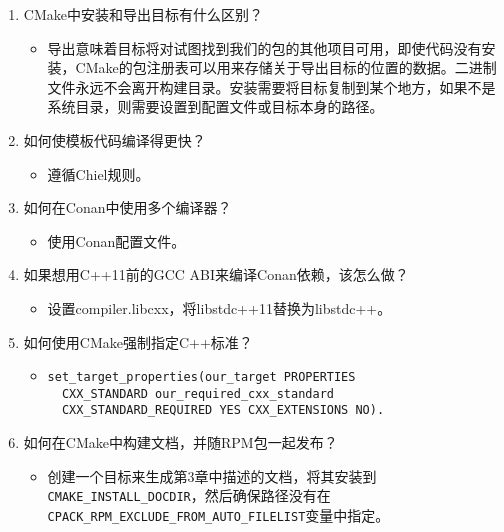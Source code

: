 \begin{enumerate}
\item
CMake中安装和导出目标有什么区别？
\begin{itemize}
\item 
导出意味着目标将对试图找到我们的包的其他项目可用，即使代码没有安装，CMake的包注册表可以用来存储关于导出目标的位置的数据。二进制文件永远不会离开构建目录。安装需要将目标复制到某个地方，如果不是系统目录，则需要设置到配置文件或目标本身的路径。
\end{itemize}

\item
如何使模板代码编译得更快？
\begin{itemize}
\item 
遵循Chiel规则。
\end{itemize}

\item
如何在Conan中使用多个编译器？
\begin{itemize}
\item 
使用Conan配置文件。
\end{itemize}

\item
如果想用C++11前的GCC ABI来编译Conan依赖，该怎么做？
\begin{itemize}
\item 
设置compiler.libcxx，将libstdc++11替换为libstdc++。
\end{itemize}

\item
如何使用CMake强制指定C++标准？
\begin{itemize}
\item 
\begin{lstlisting}[style=styleCMake]
set_target_properties(our_target PROPERTIES
  CXX_STANDARD our_required_cxx_standard
  CXX_STANDARD_REQUIRED YES CXX_EXTENSIONS NO).
\end{lstlisting}
\end{itemize}

\item
如何在CMake中构建文档，并随RPM包一起发布？
\begin{itemize}
\item 
创建一个目标来生成第3章中描述的文档，将其安装到\texttt{CMAKE\_INSTALL\_DOCDIR}，然后确保路径没有在\texttt{CPACK\_RPM\_EXCLUDE\_FROM\_AUTO\_FILELIST}变量中指定。
\end{itemize}
\end{enumerate}
